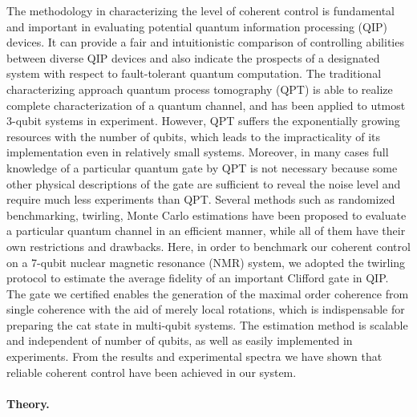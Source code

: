 \documentclass[prl,twocolumn,showpacs]{revtex4-1}
\begin{document}
The methodology in characterizing the level of coherent control is fundamental and important in evaluating potential quantum information processing (QIP) devices. It can provide a fair and intuitionistic comparison of controlling abilities between diverse QIP devices and also indicate the prospects of a designated system with respect to fault-tolerant quantum computation. The traditional characterizing approach quantum process tomography (QPT) is able to realize complete characterization of a quantum channel, and has been applied to utmost 3-qubit systems in experiment. However, QPT suffers the exponentially growing resources with the number of qubits, which leads to the impracticality of its implementation even in relatively small systems. Moreover, in many cases full knowledge of a particular quantum gate by QPT is not necessary because some other physical descriptions of the gate are sufficient to reveal the noise level and require much less experiments than QPT.  Several methods such as randomized benchmarking, twirling, Monte Carlo estimations have been proposed to evaluate a particular quantum channel in an efficient manner, while all of them have their own restrictions and drawbacks. Here, in order to benchmark our coherent control on a 7-qubit nuclear magnetic resonance (NMR) system, we adopted the twirling protocol to estimate the average fidelity of an important Clifford gate in QIP. The gate we certified enables the generation of the maximal order coherence from single coherence with the aid of merely local rotations, which is indispensable for preparing the cat state in multi-qubit systems. The estimation method is scalable and independent of number of qubits, as well as easily implemented in experiments. From the results and experimental spectra we have shown that reliable coherent control have been achieved in our system.

\paragraph*{Theory.}
\end{document}
